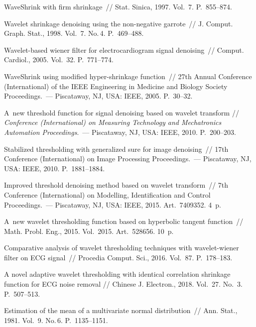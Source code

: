 \begin{multicols}{2}
{{\begin{thebibliography}{99}
 WaveShrink with firm shrinkage~// Stat. 
Sinica, 1997. Vol.~7. P.~855--874.

 Wavelet shrinkage denoising using the non-negative garrote~// 
J. Comput. Graph. Stat., 1998. Vol.~7. No.\,4. P.~469--488.

 Wavelet-based wiener filter for 
electrocardiogram signal denoising~// Comput. Cardiol., 2005. Vol.~32. P.~771--774.

WaveShrink using modified hyper-shrinkage function~// 27th Annual Conference (International) of the IEEE Engineering in Medicine and Biology Society Proceedings.~--- 
Piscataway, NJ, USA: IEEE, 2005. 
P.~30--32.

 A~new threshold function for signal denoising based on 
wavelet transform // \textit{Conference (International) on Measuring Technology and Mechatronics Automation Proceedings}.~--- 
Piscataway, NJ, USA: IEEE, 2010. P.~200--203.

 Stabilized thresholding with generalized sure 
for image denoising~// 17th Conference (International) on Image Processing Proceedings.~--- 
Piscataway, NJ, USA: IEEE, 2010. P.~1881--1884.

 Improved threshold denoising method based on 
wavelet transform~// 7th Conference (International) on Modelling, Identification and Control Proceedings.~--- Piscataway, NJ, USA: IEEE, 2015. Art.~7409352.
4~p.

 A~new wavelet thresholding 
function based on hyperbolic tangent function~// Math. Probl. Eng., 2015. Vol.~2015. Art.~528656. 10~p.

 Comparative analysis of wavelet 
thresholding techniques with wavelet-wiener filter on ECG signal~// Procedia 
Comput. Sci., 2016. Vol.~87. P.~178--183.

 A novel adaptive wavelet thresholding with identical 
correlation shrinkage function for ECG noise removal // Chinese J. Electron., 
2018. Vol.~27. No.~3. P.~507--513.

 Estimation of the mean of a multivariate normal distribution~// Ann. Stat., 1981. Vol.~9. No.\,6. P.~1135--1151.


\end{thebibliography}}}
\end{multicols}
